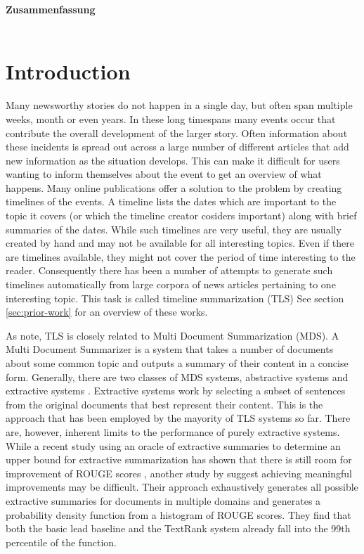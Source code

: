 \documentclass[a4paper,BCOR=10mm]{report}
\numberwithin{lemma}{chapter}
\numberwithin{definition}{chapter}
\begin{document}
\begin{titlepage}
\newpage
\noindent
\Large\textbf{Zusammenfassung}\\
\\

\newpage
\normalsize
\tableofcontents

\end{titlepage}



\chapter{Introduction}

Many newsworthy stories do not happen in a single day, but often span multiple weeks, month or even years. In these long timespans many events occur that contribute the overall development of the larger story. Often information about these incidents is spread out across a large number of different articles that add new information as the situation develops. This can make it difficult for users wanting to inform themselves about the event to get an overview of what happens. Many online publications offer a solution to the problem by creating timelines of the events. %
A timeline lists the dates which are important to the topic it covers (or which the timeline creator cosiders important) along with brief summaries of the dates.
While such timelines are very useful, they are usually created by hand and may not be available for all interesting topics. Even if there are timelines available, they might not cover the period of time interesting to the reader.
Consequently there has been a number of attempts to generate such timelines automatically from large corpora of news articles pertaining to one interesting topic. This task is called timeline summarization (TLS) See section \ref{sec:prior-work} for an overview of these works.

As \citet{markert} note, TLS is closely related to Multi Document Summarization (MDS).
A Multi Document Summarizer is a system that takes a number of documents about some common topic and outputs a summary of their content in a concise form. Generally, there are two classes of MDS systems, abstractive systems and extractive systems \citep{a-brief-survey}. Extractive systems work by selecting a subset of sentences from the original documents that best represent their content. This is the approach that has been employed by the mayority of TLS systems so far.
There are, however, inherent limits to the performance of purely extractive systems. While a recent study \citep{hirao+nishino} using an oracle of extractive summaries to determine an upper bound for extractive summarization has shown that there is still room for improvement of ROUGE scores \citep{rouge}, another study by \citet{ceylan+mihalcea} suggest achieving meaningful improvements may be difficult. Their approach exhaustively generates all possible extractive summaries for documents in multiple domains and generates a probability density function from a histogram of ROUGE scores. They find that both the basic lead baseline and the TextRank system \citep{textrank} already fall into the 99th percentile of the function.
\end{document}

